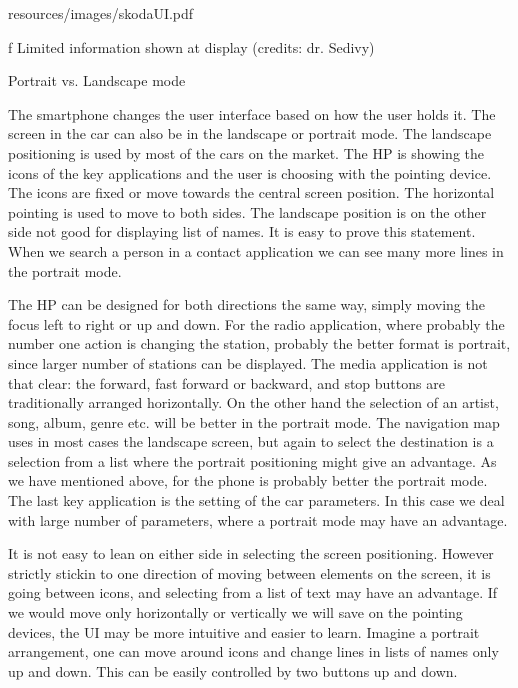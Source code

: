 \midinsert {}
\picw=10cm \cinspic resources/images/skodaUI.pdf 
\caption/f Limited information shown at display (credits: dr. Sedivy)
\endinsert

\secc Portrait vs. Landscape mode

The smartphone changes the user interface based on how the user holds it. The screen in the car can also be in the landscape or portrait mode. The landscape positioning is used by most of the cars on the market. The HP is showing the icons of the key applications and the user is choosing with the pointing device. The icons are fixed or move towards the central screen position. The horizontal pointing is used to move to both sides. The landscape position is on the other side not good for displaying list of names. It is easy to prove this statement. When we search a person in a contact application we can see many more lines in the portrait mode. 

The HP can be designed for both directions the same way, simply moving the focus left to right or up and down. For the radio application, where probably the number one action is changing the station, probably the better format is portrait, since larger number of stations can be displayed. The media application is not that clear: the forward, fast forward or backward, and stop buttons are traditionally arranged horizontally. On the other hand the selection of an artist, song, album, genre etc. will be better in the portrait mode. The navigation map uses in most cases the landscape screen, but again to select the destination is a selection from a list where the portrait positioning might give an advantage. As we have mentioned above, for the phone is probably better the portrait mode. The last key application is the setting of the car parameters. In this case we deal with large number of parameters, where a portrait mode may have an advantage.

It is not easy to lean on either side in selecting the screen positioning. However strictly stickin to one direction of moving between elements on the screen, it is going between icons, and selecting from a list of text may have an advantage. If we would move only horizontally or vertically we will save on the pointing devices, the UI may be more intuitive and easier to learn. Imagine a portrait arrangement, one can move around icons and change lines in lists of names only up and down. This can be easily controlled by two buttons up and down. 

